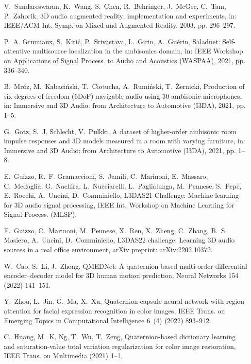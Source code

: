 \documentclass[3p, preprint, twocolumn]{elsarticle}
\begin{document}
\begin{thebibliography}{10}
V.~Sundareswaran, K.~Wang, S.~Chen, R.~Behringer, J.~McGee, C.~Tam, P.~Zahorik,
  3{D} audio augmented reality: implementation and experiments, in: {IEEE/ACM}
  Int. Symp. on Mixed and Augmented Reality, 2003, pp. 296--297.

P.~A. Grumiaux, S.~Kitić, P.~Srivastava, L.~Girin, A.~Guérin, Saladnet:
  Self-attentive multisource localization in the ambisonics domain, in: IEEE
  Workshop on Applications of Signal Process. to Audio and Acoustics (WASPAA),
  2021, pp. 336--340.

B.~Mróz, M.~Kabaciński, T.~Ciotucha, A.~Rumiński, T.~Żernicki, Production
  of six-degrees-of-freedom (6{DoF}) navigable audio using 30 ambisonic
  microphones, in: Immersive and 3D Audio: from Architecture to Automotive
  (I3DA), 2021, pp. 1--5.

G.~Götz, S.~J. Schlecht, V.~Pulkki, A dataset of higher-order ambisonic room
  impulse responses and 3{D} models measured in a room with varying furniture,
  in: Immersive and 3D Audio: from Architecture to Automotive (I3DA), 2021, pp.
  1--8.

E.~Guizzo, R.~F. Gramaccioni, S.~Jamili, C.~Marinoni, E.~Massaro, C.~Medaglia,
  G.~Nachira, L.~Nucciarelli, L.~Paglialunga, M.~Pennese, S.~Pepe, E.~Rocchi,
  A.~Uncini, D.~Comminiello, {L3DAS}21 {C}hallenge: Machine learning for 3{D}
  audio signal processing, IEEE Int. Workshop on Machine Learning for Signal
  Process. (MLSP).

E.~Guizzo, C.~Marinoni, M.~Pennese, X.~Ren, X.~Zheng, C.~Zhang, B.~S. Masiero,
  A.~Uncini, D.~Comminiello, {L3DAS22} challenge: Learning 3{D} audio sources
  in a real office environment, arXiv preprint: arXiv:2202.10372.

W.~Cao, S.~Li, J.~Zhong, {QMEDN}et: A quaternion-based multi-order differential
  encoder–decoder model for 3{D} human motion prediction, Neural Networks 154
  (2022) 141--151.

Y.~Zhou, L.~Jin, G.~Ma, X.~Xu, Quaternion capsule neural network with region
  attention for facial expression recognition in color images, IEEE Trans. on
  Emerging Topics in Computational Intelligence 6~(4) (2022) 893--912.

C.~Huang, M.~K. Ng, T.~Wu, T.~Zeng, Quaternion-based dictionary learning and
  saturation-value total variation regularization for color image restoration,
  IEEE Trans. on Multimedia (2021) 1--1.


\end{thebibliography}
\end{document}
